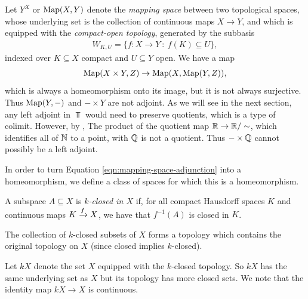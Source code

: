 \documentclass{article}[11pt]
\begin{document}
Let $Y^X$ or $\textup{Map}(X,Y)$ denote the \textit{mapping space} between two topological spaces, whose underlying set is the collection of continuous maps $X\to Y$, and which is equipped with the \textit{compact-open topology}, generated by the subbasis
\begin{align*}
	W_{K,U} = \{ f: X \to Y \ : \ f(K)\subseteq U\},
\end{align*}
indexed over $K\subseteq X$ compact and $U\subseteq Y$ open. We have a map
\begin{align}\label{eqn:mapping-space-adjunction}
	\textup{Map}(X\times Y, Z) \to \textup{Map} (X, \textup{Map}(Y,Z)),
\end{align}
which is always a homeomorphism onto its image, but it is not always surjective. Thus $\textup{Map}(Y,-)$ and $-\times Y$ are not adjoint. As we will see in the next section, any left adjoint in $\Top$ would need to preserve quotients, which is a type of colimit. However, by \cite[Section 22, Example 7]{munkres}, The product of the quotient map  $\mathbb{R}\to \mathbb{R}/\sim$, which identifies all of $\mathbb{N}$ to a point, with $\mathbb{Q}$ is not a quotient. Thus $- \times \mathbb{Q}$ cannot possibly be a left adjoint.

In order to turn Equation \ref{eqn:mapping-space-adjunction} into a homeomorphism,
we define a class of spaces for which this is a homeomorphism. %

\begin{definition} A subspace $A\subseteq X$ is \textit{$k$-closed in $X$} if, for all compact Hausdorff spaces $K$ and continuous maps $K \xrightarrow{f} X$, we have that $f^{-1}(A)$ is closed in $K$.
\end{definition}

\begin{exercise} The collection of $k$-closed subsets of $X$ forms a topology which contains the original topology on $X$ (since closed implies $k$-closed).
\end{exercise}

Let $kX$ denote the set $X$ equipped with the $k$-closed topology. So $kX$ has the same underlying set as $X$ but its topology has more closed sets. We note that the identity map $kX \to X$ is continuous.
\end{document}
